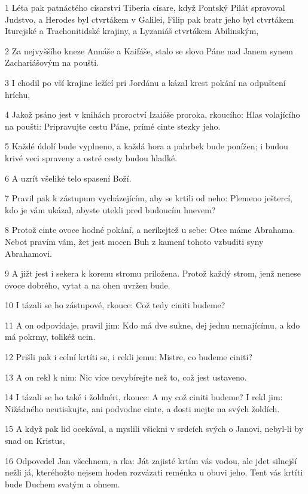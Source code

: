 \par 1 Léta pak patnáctého císarství Tiberia císare, když Pontský Pilát spravoval Judstvo, a Herodes byl ctvrtákem v Galilei, Filip pak bratr jeho byl ctvrtákem Iturejské a Trachonitidské krajiny, a Lyzaniáš ctvrtákem Abilinským,
\par 2 Za nejvyššího kneze Annáše a Kaifáše, stalo se slovo Páne nad Janem synem Zachariášovým na poušti.
\par 3 I chodil po vší krajine ležící pri Jordánu a kázal krest pokání na odpuštení hríchu,
\par 4 Jakož psáno jest v knihách proroctví Izaiáše proroka, rkoucího: Hlas volajícího na poušti: Pripravujte cestu Páne, prímé cinte stezky jeho.
\par 5 Každé údolí bude vyplneno, a každá hora a pahrbek bude ponížen; i budou krivé veci spraveny a ostré cesty budou hladké.
\par 6 A uzrít všeliké telo spasení Boží.
\par 7 Pravil pak k zástupum vycházejícím, aby se krtili od neho: Plemeno ještercí, kdo je vám ukázal, abyste utekli pred budoucím hnevem?
\par 8 Protož cinte ovoce hodné pokání, a neríkejtež u sebe: Otce máme Abrahama. Nebot pravím vám, žet jest mocen Buh z kamení tohoto vzbuditi syny Abrahamovi.
\par 9 A jižt jest i sekera k korenu stromu priložena. Protož každý strom, jenž nenese ovoce dobrého, vytat a na ohen uvržen bude.
\par 10 I tázali se ho zástupové, rkouce: Což tedy ciniti budeme?
\par 11 A on odpovídaje, pravil jim: Kdo má dve sukne, dej jednu nemajícímu, a kdo má pokrmy, tolikéž ucin.
\par 12 Prišli pak i celní krtíti se, i rekli jemu: Mistre, co budeme ciniti?
\par 13 A on rekl k nim: Nic více nevybírejte než to, což jest ustaveno.
\par 14 I tázali se ho také i žoldnéri, rkouce: A my což ciniti budeme? I rekl jim: Nižádného neutiskujte, ani podvodne cinte, a dosti mejte na svých žoldích.
\par 15 A když pak lid ocekával, a myslili všickni v srdcích svých o Janovi, nebyl-li by snad on Kristus,
\par 16 Odpovedel Jan všechnem, a rka: Ját zajisté krtím vás vodou, ale jdet silnejší nežli já, kteréhožto nejsem hoden rozvázati reménka u obuvi jeho. Tent vás krtíti bude Duchem svatým a ohnem.
